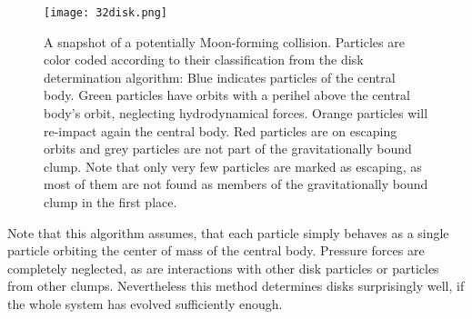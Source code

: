 \begin{figure}[htbp]
\begin{center}
\texttt{[image: 32disk.png]}
\caption{A snapshot of a potentially Moon-forming collision. Particles are color coded according to their classification from the disk determination algorithm: Blue indicates particles of the central body. Green particles have orbits with a perihel above the central body's orbit, neglecting hydrodynamical forces. Orange particles will re-impact again the central body. Red particles are on escaping orbits and grey particles are not part of the gravitationally bound clump. Note that only very few particles are marked as escaping, as most of them are not found as members of the gravitationally bound clump in the first place.}
\label{ch02_fig32}
\end{center}
\end{figure}

Note that this algorithm assumes, that each particle simply behaves as a single particle orbiting the center of mass of the central body. Pressure forces are completely neglected, as are interactions with other disk particles or particles from other clumps. Nevertheless this method determines disks surprisingly well, if the whole system has evolved sufficiently enough. 


